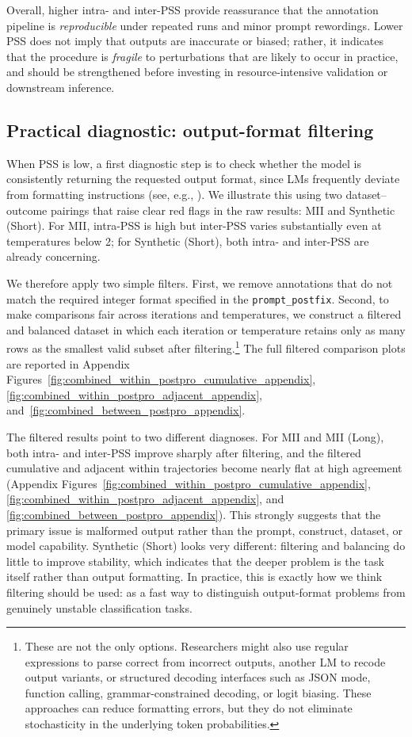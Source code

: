 \documentclass{article}
\begin{document}
Overall, higher intra- and inter-PSS provide reassurance that the annotation pipeline is \emph{reproducible} under repeated runs and minor prompt rewordings. Lower PSS does not imply that outputs are inaccurate or biased; rather, it indicates that the procedure is \emph{fragile} to perturbations that are likely to occur in practice, and should be strengthened before investing in resource-intensive validation or downstream inference.

\subsection{Practical diagnostic: output-format filtering}

When PSS is low, a first diagnostic step is to check whether the model is consistently returning the requested output format, since LMs frequently deviate from formatting instructions (see, e.g., \cite{mellon2024ais}). We illustrate this using two dataset--outcome pairings that raise clear red flags in the raw results: MII and Synthetic (Short). For MII, intra-PSS is high but inter-PSS varies substantially even at temperatures below 2; for Synthetic (Short), both intra- and inter-PSS are already concerning.

We therefore apply two simple filters. First, we remove annotations that do not match the required integer format specified in the \texttt{prompt\_postfix}. Second, to make comparisons fair across iterations and temperatures, we construct a filtered and balanced dataset in which each iteration or temperature retains only as many rows as the smallest valid subset after filtering.\footnote{These are not the only options. Researchers might also use regular expressions to parse correct from incorrect outputs, another LM to recode output variants, or structured decoding interfaces such as JSON mode, function calling, grammar-constrained decoding, or logit biasing. These approaches can reduce formatting errors, but they do not eliminate stochasticity in the underlying token probabilities.} The full filtered comparison plots are reported in Appendix Figures~\ref{fig:combined_within_postpro_cumulative_appendix}, \ref{fig:combined_within_postpro_adjacent_appendix}, and~\ref{fig:combined_between_postpro_appendix}.

The filtered results point to two different diagnoses. For MII and MII (Long), both intra- and inter-PSS improve sharply after filtering, and the filtered cumulative and adjacent within trajectories become nearly flat at high agreement (Appendix Figures~\ref{fig:combined_within_postpro_cumulative_appendix}, \ref{fig:combined_within_postpro_adjacent_appendix}, and \ref{fig:combined_between_postpro_appendix}). This strongly suggests that the primary issue is malformed output rather than the prompt, construct, dataset, or model capability. Synthetic (Short) looks very different: filtering and balancing do little to improve stability, which indicates that the deeper problem is the task itself rather than output formatting. In practice, this is exactly how we think filtering should be used: as a fast way to distinguish output-format problems from genuinely unstable classification tasks.
\end{document}
